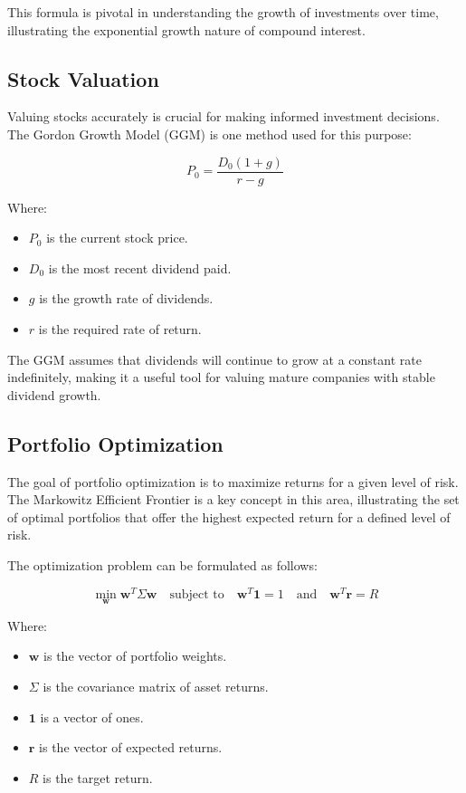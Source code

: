 \documentclass{article}
\begin{document}
This formula is pivotal in understanding the growth of investments over time, illustrating the exponential growth nature of compound interest.

\subsection{Stock Valuation}
Valuing stocks accurately is crucial for making informed investment decisions. The Gordon Growth Model (GGM) is one method used for this purpose:

\[
P_0 = \frac{D_0 (1 + g)}{r - g}
\]

Where:
\begin{itemize}
	\item $P_0$ is the current stock price.
	\item $D_0$ is the most recent dividend paid.
	\item $g$ is the growth rate of dividends.
	\item $r$ is the required rate of return.
\end{itemize}

The GGM assumes that dividends will continue to grow at a constant rate indefinitely, making it a useful tool for valuing mature companies with stable dividend growth.

\subsection{Portfolio Optimization}
The goal of portfolio optimization is to maximize returns for a given level of risk. The Markowitz Efficient Frontier is a key concept in this area, illustrating the set of optimal portfolios that offer the highest expected return for a defined level of risk.

The optimization problem can be formulated as follows:

\[
\min_{\mathbf{w}} \mathbf{w}^T \Sigma \mathbf{w} \quad \text{subject to} \quad \mathbf{w}^T \mathbf{1} = 1 \quad \text{and} \quad \mathbf{w}^T \mathbf{r} = R
\]

Where:
\begin{itemize}
	\item $\mathbf{w}$ is the vector of portfolio weights.
	\item $\Sigma$ is the covariance matrix of asset returns.
	\item $\mathbf{1}$ is a vector of ones.
	\item $\mathbf{r}$ is the vector of expected returns.
	\item $R$ is the target return.
\end{itemize}
\end{document}
